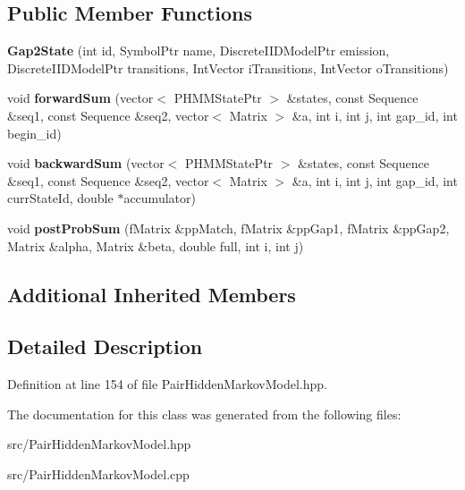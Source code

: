 \subsection*{Public Member Functions}
\begin{DoxyCompactItemize}
\item 
\mbox{\label{classtops_1_1Gap2State_a1f4a9a225a9dcefc67d364083b59fc09}} 
{\bfseries Gap2\+State} (int id, Symbol\+Ptr name, Discrete\+I\+I\+D\+Model\+Ptr emission, Discrete\+I\+I\+D\+Model\+Ptr transitions, Int\+Vector i\+Transitions, Int\+Vector o\+Transitions)
\item 
\mbox{\label{classtops_1_1Gap2State_a19924067024ba8df5b31080d47e85115}} 
void {\bfseries forward\+Sum} (vector$<$ P\+H\+M\+M\+State\+Ptr $>$ \&states, const Sequence \&seq1, const Sequence \&seq2, vector$<$ Matrix $>$ \&a, int i, int j, int gap\+\_\+id, int begin\+\_\+id)
\item 
\mbox{\label{classtops_1_1Gap2State_a0da1865f5076ad454cc6fe604f00e112}} 
void {\bfseries backward\+Sum} (vector$<$ P\+H\+M\+M\+State\+Ptr $>$ \&states, const Sequence \&seq1, const Sequence \&seq2, vector$<$ Matrix $>$ \&a, int i, int j, int gap\+\_\+id, int curr\+State\+Id, double $\ast$accumulator)
\item 
\mbox{\label{classtops_1_1Gap2State_a9e593194fb1a6a1cb9c2b970644f7f5d}} 
void {\bfseries post\+Prob\+Sum} (f\+Matrix \&pp\+Match, f\+Matrix \&pp\+Gap1, f\+Matrix \&pp\+Gap2, Matrix \&alpha, Matrix \&beta, double full, int i, int j)
\end{DoxyCompactItemize}
\subsection*{Additional Inherited Members}


\subsection{Detailed Description}


Definition at line 154 of file Pair\+Hidden\+Markov\+Model.\+hpp.



The documentation for this class was generated from the following files\+:\begin{DoxyCompactItemize}
\item 
src/Pair\+Hidden\+Markov\+Model.\+hpp\item 
src/Pair\+Hidden\+Markov\+Model.\+cpp\end{DoxyCompactItemize}
